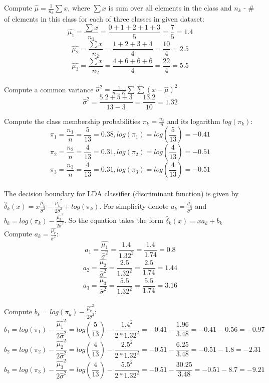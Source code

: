 \documentclass[a4paper,12pt,titlepage]{article} %
\begin{document}
Compute $ \hat{\mu} = \frac{1}{n_{k}} \sum{x} $, where $ \sum{x} $ is sum over all elements in the class and $ n_{k} $ - \# of elements in this class for each of three classes in given dataset:
$$ \hat{\mu_{1}} = \frac{\sum{x} }{n_{1} } = \frac{0+1+2+1+3}{5} = \frac{7}{5} = 1.4 $$
$$ \hat{\mu_{2}} = \frac{\sum{x} }{n_{2} } = \frac{1+2+3+4}{4} = \frac{10}{4} = 2.5 $$
$$ \hat{\mu_{3}} = \frac{\sum{x} }{n_{2} } = \frac{4+6+6+6}{4} = \frac{22}{4} = 5.5 $$\\

Compute a common variance $ \hat{\sigma}^{2} = \frac{1}{n-K} \sum \sum{(x - \hat{\mu})^{2}} $
$$ \hat{\sigma}^{2} = \frac {5.2+5+3}{13-3} = \frac{13.2}{10} = 1.32 $$

Compute the class membership probabilities $ \pi_{k} = \frac{n_{k} }{n}$ and its logarithm $ log(\pi_{k})$:
$$ \pi_{1} = \frac{n_{1} }{n} = \frac{5}{13} = 0.38, log(\pi_{1}) = log(\frac{5}{13}) = -0.41 $$
$$ \pi_{2} = \frac{n_{2} }{n} = \frac{4}{13} = 0.31, log(\pi_{2}) = log(\frac{4}{13}) = -0.51 $$
$$ \pi_{3} = \frac{n_{3} }{n} = \frac{4}{13} = 0.31, log(\pi_{3}) = log(\frac{4}{13}) = -0.51 $$\\

The decision boundary for LDA classifier (discriminant function) is given by $ \hat{\delta}_{k}(x) = x \frac{\hat{\mu_{k}} }{\hat{\sigma}^{2}} - \frac{\hat{\mu_{k}}^{2} }{2\hat{\sigma}^{2} } + log(\pi_{k})$. 
For simplicity denote $ a_{k} = \frac{\hat{\mu_{k}} }{\hat{\sigma}^{2}} $ and $ b_{k} = log(\pi_{k}) - \frac{\hat{\mu_{k}}^{2} }{2\hat{\sigma}^{2} }$. 
So the equation takes the form $ \hat{\delta}_{k}(x) = x a_{k} + b_{k}$\\

Compute $ a_{k} = \frac{\hat{\mu_{k}} }{\hat{\sigma}^{2}} $:
$$ a_{1} = \frac{\hat{\mu_{1}} }{\hat{\sigma}^{2}} = \frac{1.4}{1.32^{2}} = \frac{1.4}{1.74} = 0.8 $$
$$ a_{2} = \frac{\hat{\mu_{2}} }{\hat{\sigma}^{2}} = \frac{2.5}{1.32^{2}} = \frac{2.5}{1.74} = 1.44 $$
$$ a_{3} = \frac{\hat{\mu_{3}} }{\hat{\sigma}^{2}} = \frac{5.5}{1.32^{2}} = \frac{5.5}{1.74} = 3.16 $$\\

Compute $ b_{k} = log(\pi_{k}) - \frac{\hat{\mu_{k}}^{2} }{2\hat{\sigma}^{2} }$:
$$ b_{1} = log(\pi_{1}) - \frac{\hat{\mu_{1}}^{2} }{2\hat{\sigma}^{2} } = log(\frac{5}{13}) - \frac{1.4^{2}}{2*1.32^{2}} = -0.41 - \frac{1.96}{3.48} = -0.41 - 0.56 = -0.97 $$
$$ b_{2} = log(\pi_{2}) - \frac{\hat{\mu_{2}}^{2} }{2\hat{\sigma}^{2} } = log(\frac{4}{13}) - \frac{2.5^{2}}{2*1.32^{2}} = -0.51 - \frac{6.25}{3.48} = -0.51 - 1.8 = -2.31 $$
$$ b_{3} = log(\pi_{3}) - \frac{\hat{\mu_{3}}^{2} }{2\hat{\sigma}^{2} } = log(\frac{4}{13}) - \frac{5.5^{2}}{2*1.32^{2}} = -0.51 - \frac{30.25}{3.48} = -0.51 - 8.7 = -9.21 $$\\
\end{document}
